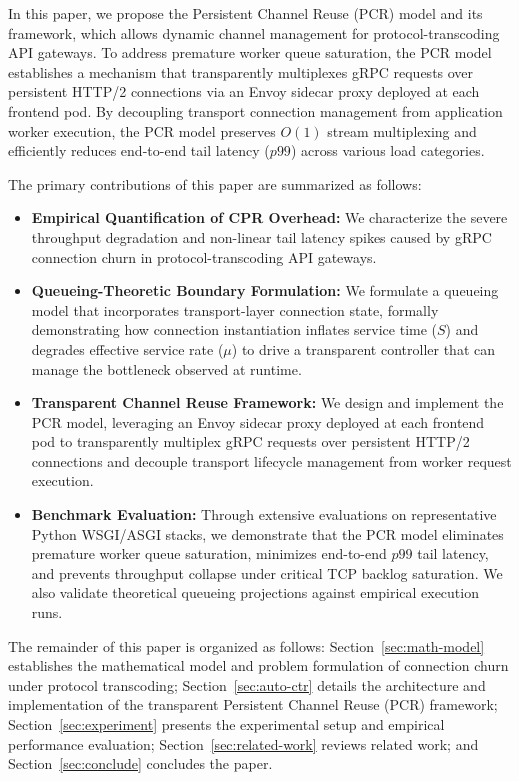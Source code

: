 \documentclass{ieeeaccess}
\begin{document}
	
	
In this paper, we propose the Persistent Channel Reuse (PCR) model and its framework, which allows dynamic channel management for protocol-transcoding API gateways. To address premature worker queue saturation, the PCR model establishes a mechanism that transparently multiplexes gRPC requests over persistent HTTP/2 connections via an Envoy sidecar proxy deployed at each frontend pod. By decoupling transport connection management from application worker execution, the PCR model preserves $O(1)$ stream multiplexing and efficiently reduces end-to-end tail latency ($p99$) across various load categories.
	
	
	The primary contributions of this paper are summarized as follows:
	\begin{itemize}
		\item \textbf{Empirical Quantification of CPR Overhead:} We characterize the severe throughput degradation and non-linear tail latency spikes caused by gRPC connection churn in protocol-transcoding API gateways.
		\item \textbf{Queueing-Theoretic Boundary Formulation:} We formulate a queueing model that incorporates transport-layer connection state, formally demonstrating how connection instantiation inflates service time ($S$) and degrades effective service rate ($\mu$) to drive a transparent controller that can manage the bottleneck observed at runtime.
		
		\item \textbf{Transparent Channel Reuse Framework:} We design and implement the PCR model, leveraging an Envoy sidecar proxy deployed at each frontend pod to transparently multiplex gRPC requests over persistent HTTP/2 connections and decouple transport lifecycle management from worker request execution.
		\item \textbf{Benchmark Evaluation:} Through extensive evaluations on representative Python WSGI/ASGI stacks, we demonstrate that the PCR model eliminates premature worker queue saturation, minimizes end-to-end $p99$ tail latency, and prevents throughput collapse under critical TCP backlog saturation.  We also validate theoretical queueing projections against empirical execution runs.
	\end{itemize}
	
	The remainder of this paper is organized as follows: Section~\ref{sec:math-model} establishes the mathematical model and problem formulation of connection churn under protocol transcoding; Section~\ref{sec:auto-ctr} details the architecture and implementation of the transparent Persistent Channel Reuse (PCR) framework; Section~\ref{sec:experiment} presents the experimental setup and empirical performance evaluation; Section~\ref{sec:related-work} reviews related work; and Section~\ref{sec:conclude} concludes the paper.
	
\end{document}
